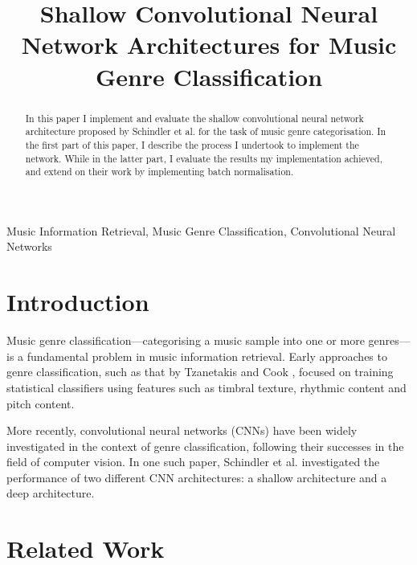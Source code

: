 \documentclass[conference]{IEEEtran}
\begin{document}
\title{Shallow Convolutional Neural Network Architectures for Music Genre Classification}

\author{
}

\maketitle

\begin{abstract}
In this paper I implement and evaluate the shallow convolutional neural network architecture proposed by Schindler et al. \cite{SchindlerLidyRauber} for the task of music genre categorisation.
In the first part of this paper, I describe the process I undertook to implement the network.
While in the latter part, I evaluate the results my implementation achieved, and extend on their work by implementing batch normalisation.
\end{abstract}

\begin{IEEEkeywords}
Music Information Retrieval, Music Genre Classification, Convolutional Neural Networks
\end{IEEEkeywords}

\section{Introduction}

Music genre classification---categorising a music sample into one or more genres---is a fundamental problem in music information retrieval.
Early approaches to genre classification, such as that by Tzanetakis and Cook \cite{TzanetakisCook}, focused on training statistical classifiers using features such as timbral texture, rhythmic content and pitch content.

More recently, convolutional neural networks (CNNs) have been widely investigated in the context of genre classification, following their successes in the field of computer vision.
In one such paper, Schindler et al. \cite{SchindlerLidyRauber} investigated the performance of two different CNN architectures: a shallow architecture and a deep architecture.

\section{Related Work}
\end{document}
